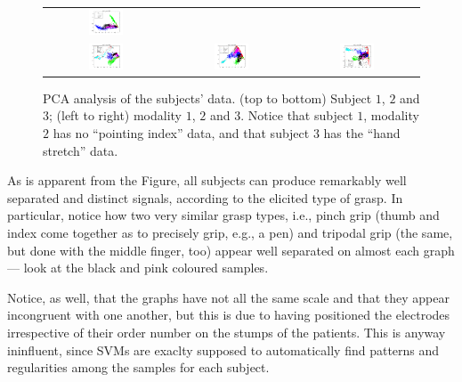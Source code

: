 \begin{figure}[!ht]
\begin{tabular}{ccc}
    \includegraphics[width=0.3\textwidth]{figs/data23} \\
    \includegraphics[width=0.3\textwidth]{figs/data31} &
    \includegraphics[width=0.3\textwidth]{figs/data32} &
    \includegraphics[width=0.3\textwidth]{figs/data33} \\
  \end{tabular}
  \caption{ PCA analysis of the subjects' data. (top to bottom)
    Subject $1$, $2$ and $3$; (left to right) modality $1$, $2$ and
    $3$. Notice that subject $1$, modality $2$ has no ``pointing
    index'' data, and that subject $3$ has the ``hand stretch'' data.}
  \label{fig:PCA}
\end{figure}

As is apparent from the Figure, all subjects can produce remarkably
well separated and distinct signals, according to the elicited type of
grasp. In particular, notice how two very similar grasp types, i.e.,
pinch grip (thumb and index come together as to precisely grip, e.g.,
a pen) and tripodal grip (the same, but done with the middle finger,
too) appear well separated on almost each graph --- look at the black
and pink coloured samples.

Notice, as well, that the graphs have not all the same scale and that
they appear incongruent with one another, but this is due to
having positioned the electrodes irrespective of their order number on
the stumps of the patients. This is anyway ininfluent, since SVMs
are exaclty supposed to automatically find patterns and regularities
among the samples for each subject.

